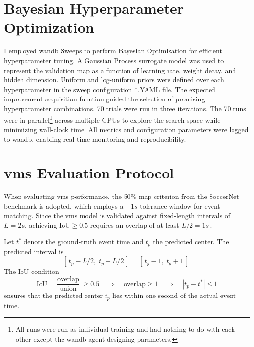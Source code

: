 \section{Bayesian Hyperparameter Optimization}
\label{sec:bayesian_optimization}

I employed \acrshort{wandb} Sweeps to perform Bayesian Optimization for efficient hyperparameter tuning. A Gaussian Process surrogate model was used to represent the validation \acrshort{map} as a function of learning rate, weight decay, and hidden dimension. Uniform and log-uniform priors were defined over each hyperparameter in the sweep configuration *.YAML file. The expected improvement acquisition function guided the selection of promising hyperparameter combinations. 70 trials were run in three iterations. The 70 runs were in parallel\footnote{All runs were run as individual training and had nothing to do with each other except the \acrshort{wandb} agent designing parameters. } across multiple GPUs to explore the search space while minimizing wall-clock time. All metrics and configuration parameters were logged to \acrshort{wandb}, enabling real-time monitoring and reproducibility. 





\section{\acrshort{vms} Evaluation Protocol}
When evaluating \acrshort{vms} performance, the 50\% \acrshort{map} criterion from the SoccerNet benchmark is adopted, which employs a $\pm1s$ tolerance window for event matching. Since the \acrshort{vms} model is validated against fixed‐length intervals of $L = 2\,$s, achieving $\mathrm{IoU}\ge0.5$ requires an overlap of at least $L/2 = 1s\,$.

Let $t^*$ denote the ground‐truth event time and $t_p$ the predicted center. The predicted interval is
\[
    [\,t_p - L/2,\;t_p + L/2\,]
    = [\,t_p - 1,\;t_p + 1\,].
\] 
The IoU condition
\[
    \mathrm{IoU}
    = \frac{\text{overlap}}{\text{union}}
    \;\ge0.5
    \quad\Longrightarrow\quad
    \text{overlap}\ge1
    \quad\Longrightarrow\quad
    |t_p - t^*|\le1
\]
ensures that the predicted center $t_p$ lies within one second of the actual event time.

